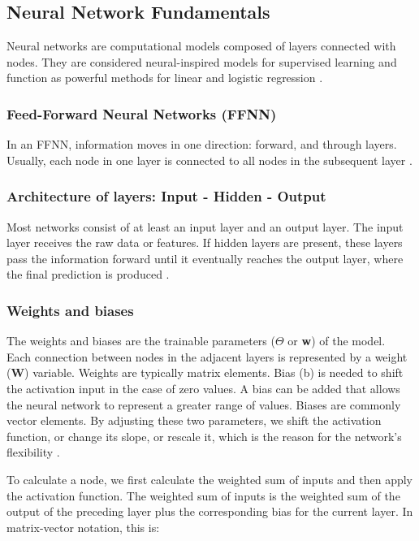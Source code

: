 \documentclass[amssymb,twocolumn,aps,floatfix]{revtex4-2}
\begin{document}
\subsection{Neural Network Fundamentals}

Neural networks are computational models composed of layers connected with nodes. They are considered neural-inspired models for supervised learning and function as powerful methods for linear and logistic regression \cite{compfys_ch13}. 

\subsubsection{Feed-Forward Neural Networks (FFNN)}

In an FFNN, information moves in one direction: forward, and through layers. Usually, each node in one layer is connected to all nodes in the subsequent layer \cite{compfys_ch13}. 

\subsubsection{Architecture of layers: Input - Hidden - Output}

Most networks consist of at least an input layer and an output layer. The input layer receives the raw data or features. If hidden layers are present, these layers pass the information forward until it eventually reaches the output layer, where the final prediction is produced \cite{compfys_ch13}. 

\subsubsection{Weights and biases}
The weights and biases are the trainable parameters ($\Theta$ or \textbf{w}) of the model. \\

Each connection between nodes in the adjacent layers is represented by a weight (\textbf{W}) variable. Weights are typically matrix elements. Bias (b) is needed to shift the activation input in the case of zero values. A bias can be added that allows the neural network to represent a greater range of values. Biases are commonly vector elements. By adjusting these two parameters, we shift the activation function, or change its slope, or rescale it, which is the reason for the network's flexibility \cite{compfys_ch13} \cite{hjorthjensen_week41_misc}. 

To calculate a node, we first calculate the weighted sum of inputs and then apply the activation function. The weighted sum of inputs is the weighted sum of the output of the preceding layer plus the corresponding bias for the current layer. In matrix-vector notation, this is: 
\end{document}
